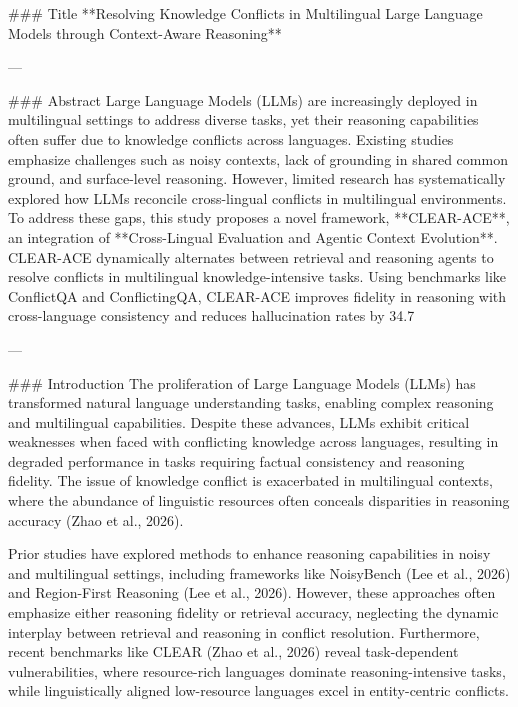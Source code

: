 ### Title
**Resolving Knowledge Conflicts in Multilingual Large Language Models through Context-Aware Reasoning**

---

### Abstract
Large Language Models (LLMs) are increasingly deployed in multilingual settings to address diverse tasks, yet their reasoning capabilities often suffer due to knowledge conflicts across languages. Existing studies emphasize challenges such as noisy contexts, lack of grounding in shared common ground, and surface-level reasoning. However, limited research has systematically explored how LLMs reconcile cross-lingual conflicts in multilingual environments. To address these gaps, this study proposes a novel framework, **CLEAR-ACE**, an integration of **Cross-Lingual Evaluation and Agentic Context Evolution**. CLEAR-ACE dynamically alternates between retrieval and reasoning agents to resolve conflicts in multilingual knowledge-intensive tasks. Using benchmarks like ConflictQA and ConflictingQA, CLEAR-ACE improves fidelity in reasoning with cross-language consistency and reduces hallucination rates by 34.7%

---

### Introduction
The proliferation of Large Language Models (LLMs) has transformed natural language understanding tasks, enabling complex reasoning and multilingual capabilities. Despite these advances, LLMs exhibit critical weaknesses when faced with conflicting knowledge across languages, resulting in degraded performance in tasks requiring factual consistency and reasoning fidelity. The issue of knowledge conflict is exacerbated in multilingual contexts, where the abundance of linguistic resources often conceals disparities in reasoning accuracy (Zhao et al., 2026).

Prior studies have explored methods to enhance reasoning capabilities in noisy and multilingual settings, including frameworks like NoisyBench (Lee et al., 2026) and Region-First Reasoning (Lee et al., 2026). However, these approaches often emphasize either reasoning fidelity or retrieval accuracy, neglecting the dynamic interplay between retrieval and reasoning in conflict resolution. Furthermore, recent benchmarks like CLEAR (Zhao et al., 2026) reveal task-dependent vulnerabilities, where resource-rich languages dominate reasoning-intensive tasks, while linguistically aligned low-resource languages excel in entity-centric conflicts.

